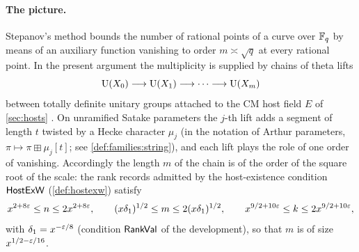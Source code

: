 \paragraph{The picture.}
Stepanov's method bounds the number of rational points of a curve over $\mathbb{F}_q$ by means of an auxiliary function
vanishing to order $m\asymp\sqrt q$ at every rational point. In the present argument the multiplicity is
supplied by chains of theta lifts
\begin{equation}\label{eq:families:chain}
\operatorname{U}(X_0)\longrightarrow\operatorname{U}(X_1)\longrightarrow\cdots\longrightarrow\operatorname{U}(X_m)
\end{equation}
between totally definite unitary groups attached to the CM host field $E$ of \cref{sec:hosts}
\cite{Announcement2026}. On unramified Satake parameters the $j$-th lift adds a segment of length $t$
twisted by a Hecke character $\mu_j$ (in the notation of Arthur parameters, $\pi\mapsto\pi\boxplus\mu_j[t]$;
see \cref{def:families:string}), and each lift plays the role of one order of vanishing. Accordingly the
length $m$ of the chain is of the order of the square root of the scale: the rank records admitted by the
host-existence condition $\mathsf{HostExW}$ (\cref{def:hostexw}) satisfy
\begin{equation}\label{eq:families:rankval}
x^{2+8\varepsilon}\le n\le 2x^{2+8\varepsilon},\qquad (x\delta_1)^{1/2}\le m\le 2(x\delta_1)^{1/2},\qquad
x^{9/2+10\varepsilon}\le k\le 2x^{9/2+10\varepsilon},
\end{equation}
with $\delta_1=x^{-\varepsilon/8}$ (condition $\mathsf{RankVal}$ of the development), so that $m$ is of size
$x^{1/2-\varepsilon/16}$.


